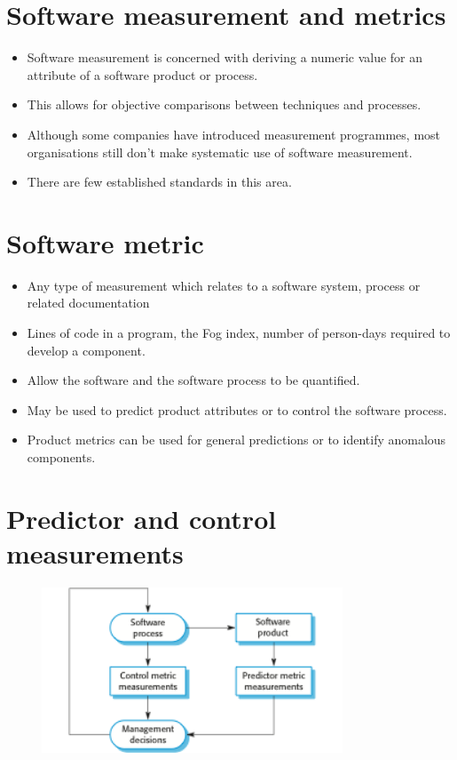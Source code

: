 \section {Software measurement and metrics}
\begin{itemize}
\item Software measurement is concerned with deriving a numeric value for an attribute of a software product or process.

\item This allows for objective comparisons between techniques and processes.

\item Although some companies have introduced measurement programmes, most organisations still don’t make systematic use of software measurement.

\item There are few established standards in this area.

\end{itemize}
\section {Software metric}
\begin{itemize}

\item Any type of measurement which relates to a software system, process or related documentation

  \item Lines of code in a program, the Fog index, number of person-days required to develop a component.

\item Allow the software and the software process to be quantified.

\item May be used to predict product attributes or to control the software process.

\item Product metrics can be used for general predictions or to identify anomalous components.
\end{itemize}
\section {Predictor and control measurements}
\begin{figure}[h!]
    \centering
    \includegraphics[width = 0.8\textwidth]{./figures/L7_6.png}
    \caption{}
    \label{fig:L7_6}
\end{figure}


